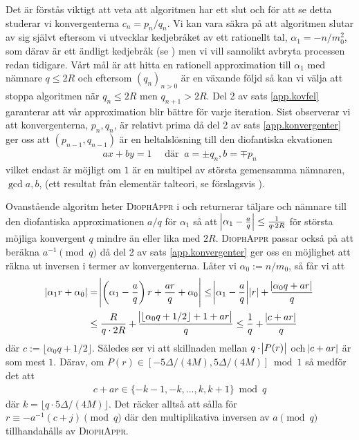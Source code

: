 Det är förstås viktigt att veta att algoritmen har ett slut och för att se detta studerar vi konvergenterna \(c_n = p_n / q_n\). Vi kan vara säkra på att algoritmen slutar av sig självt eftersom vi utvecklar kedjebråket av ett rationellt tal, \(\alpha_1 = - n / m_0^2\), som därav är ett ändligt kedjebråk (se \cite[Sats 21.5]{Lindahl}) men vi vill sannolikt avbryta processen redan tidigare. Vårt mål är att hitta en rationell approximation till \(\alpha_1\) med nämnare \(q \leq 2R\) och eftersom \((q_n)_{n>0}\) är en växande följd så kan vi välja att stoppa algoritmen när \(q_n \leq 2 R\) men \(q_{n + 1} > 2R\). Del 2 av sats \ref{app.kovfel} garanterar att vår approximation blir bättre för varje iteration. Sist observerar vi att konvergenterna, \(p_n, q_n\), är relativt prima då del 2 av sats \ref{app.konvergenter} ger oss att \((p_{n-1}, q_{n-1})\) är en heltalslösning till den diofantiska ekvationen
\begin{align*}
    a x + b y = 1 \quad \text{ där }\ a = \pm q_n, b = \mp p_n
\end{align*}
vilket endast är möjligt om \(1\) är en multipel av största gemensamma nämnaren, \(\gcd{a,b}\), (ett resultat från elementär talteori, se förslagsvis \cite[Sats 3.1]{Lindahl}). %

Ovanstående algoritm heter \textsc{DiophAppr} i \cite{HaraldSieve} och returnerar täljare och nämnare till den diofantiska approximationen \(a/q\) för \(\alpha_1\) så att \(\abs{\alpha_1 - \frac{a}{q}} \leq \frac{1}{q \cdot 2R}\) för största möjliga konvergent $q$ mindre än eller lika med \(2R\). \textsc{DiophAppr} passar också på att beräkna \(a^{-1} \pmod{q}\) då del 2 av sats \ref{app.konvergenter} ger oss en möjlighet att räkna ut inversen i termer av konvergenterna. Låter vi \(\alpha_0 := n / m_0\), så får vi att 
\begin{align*}
    \abs{\alpha_1 r + \alpha_0} &= \abs{\left(\alpha_1 - \frac{a}{q}\right) r + \frac{ar}{q} + \alpha_0} \leq 
    \abs{\alpha_1 - \frac{a}{q}} \abs{r} + \frac{\abs{\alpha_0 q + ar}}{q} \\
    &\leq \frac{R}{q \cdot 2R} + \frac{\abs{\lfloor \alpha_0 q + 1/2 \rfloor + 1 + ar}}{q} \leq
    \frac{1}{q} + \frac{\abs{c + ar}}{q}
\end{align*}
där \(c := \lfloor \alpha_0 q + 1/2 \rfloor\). Således ser vi att skillnaden mellan \(q \cdot \abs{P(r)}\) och \(\abs{c + ar}\) är som mest \(1\). Därav, om \(P(r) \in [-5\Delta/(4M), 5\Delta/(4M)] \bmod 1\) så medför det att
\begin{align*}
    c + ar \in \{- k - 1, - k, ... , k, k + 1\} \bmod q
\end{align*}
där \(k = \lfloor q \cdot 5\Delta/(4M) \rfloor\). Det räcker alltså att sålla för \(r \equiv - a^{-1} (c + j) \pmod{q}\) där den multiplikativa inversen av $a \pmod{q}$ tillhandahålls av \textsc{DiophAppr}. %


